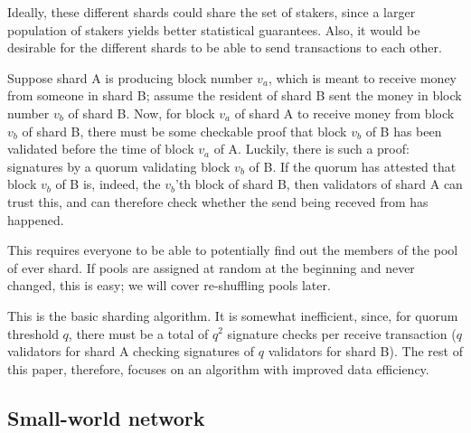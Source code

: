 \documentclass{article}
\begin{document}
Ideally, these different shards could share the set of stakers, since a larger
population of stakers yields better statistical guarantees.  Also, it would be
desirable for the different shards to be able to send transactions to each
other.

Suppose shard A is producing block number $v_a$, which is meant to receive money
from someone in shard B; assume the resident of shard B sent the money in block
number $v_b$ of shard B.  Now, for block $v_a$ of shard A to receive money from block $v_b$ of shard B,
there must be some checkable proof that block $v_b$ of B has been validated before the
time of block $v_a$ of A.  Luckily, there is such a proof: signatures by a quorum
validating block $v_b$ of B.  If the quorum has attested that block $v_b$ of B is, indeed,
the $v_b$'th block of shard B, then validators of shard A can trust this, and can
therefore check whether the send being receved from has happened.

This requires everyone to be able to potentially find out the members of the pool
of ever shard.  If pools are assigned at random at the beginning and never changed,
this is easy; we will cover re-shuffling pools later.

This is the basic sharding algorithm.  It is somewhat inefficient, since, for
quorum threshold $q$, there must be a total of $q^2$ signature checks per
receive transaction ($q$ validators for shard A checking signatures of $q$
validators for shard B).  The rest of this paper, therefore, focuses on an
algorithm with improved data efficiency.


\subsection{Small-world network}
\end{document}
